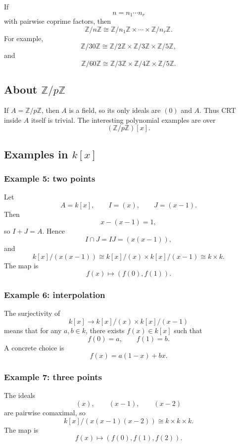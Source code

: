 \documentclass[12pt,a4paper]{article}
\theoremstyle{notespace}
\begin{document}
If
\[
n=n_1\cdots n_r
\]
with pairwise coprime factors, then
\[
\mathbb Z/n\mathbb Z
\cong
\mathbb Z/n_1\mathbb Z\times\cdots\times \mathbb Z/n_r\mathbb Z.
\]
For example,
\[
\mathbb Z/30\mathbb Z\cong \mathbb Z/2\mathbb Z\times \mathbb Z/3\mathbb Z\times \mathbb Z/5\mathbb Z,
\]
and
\[
\mathbb Z/60\mathbb Z\cong \mathbb Z/3\mathbb Z\times \mathbb Z/4\mathbb Z\times \mathbb Z/5\mathbb Z.
\]

\subsection{About \(\mathbb Z/p\mathbb Z\)}

If \(A=\mathbb Z/p\mathbb Z\), then \(A\) is a field, so its only ideals are \((0)\) and \(A\). Thus CRT inside \(A\) itself is trivial. The interesting polynomial examples are over
\[
(\mathbb Z/p\mathbb Z)[x].
\]

\subsection{Examples in \(k[x]\)}

\subsubsection*{Example 5: two points}

Let
\[
A=k[x],\qquad I=(x),\qquad J=(x-1).
\]
Then
\[
x-(x-1)=1,
\]
so \(I+J=A\). Hence
\[
I\cap J=IJ=(x(x-1)),
\]
and
\[
k[x]/(x(x-1))\cong k[x]/(x)\times k[x]/(x-1)\cong k\times k.
\]
The map is
\[
f(x)\mapsto (f(0),f(1)).
\]

\subsubsection*{Example 6: interpolation}

The surjectivity of
\[
k[x]\to k[x]/(x)\times k[x]/(x-1)
\]
means that for any \(a,b\in k\), there exists \(f(x)\in k[x]\) such that
\[
f(0)=a,\qquad f(1)=b.
\]
A concrete choice is
\[
f(x)=a(1-x)+bx.
\]

\subsubsection*{Example 7: three points}

The ideals
\[
(x),\qquad (x-1),\qquad (x-2)
\]
are pairwise comaximal, so
\[
k[x]/(x(x-1)(x-2))
\cong
k\times k\times k.
\]
The map is
\[
f(x)\mapsto (f(0),f(1),f(2)).
\]
\end{document}
